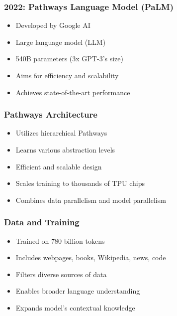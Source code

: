 \begin{frame}[fragile]\frametitle{2022: Pathways Language Model (PaLM)}
    
    \begin{itemize}
        \item Developed by Google AI
        \item Large language model (LLM)
        \item 540B parameters (3x GPT-3's size)
        \item Aims for efficiency and scalability
        \item Achieves state-of-the-art performance
    \end{itemize}
\end{frame}

\begin{frame}[fragile]\frametitle{Pathways Architecture}
    
    \begin{itemize}
        \item Utilizes hierarchical Pathways
        \item Learns various abstraction levels
        \item Efficient and scalable design
        \item Scales training to thousands of TPU chips
        \item Combines data parallelism and model parallelism
    \end{itemize}
\end{frame}

\begin{frame}[fragile]\frametitle{Data and Training}
    
    \begin{itemize}
        \item Trained on 780 billion tokens
        \item Includes webpages, books, Wikipedia, news, code
        \item Filters diverse sources of data
        \item Enables broader language understanding
        \item Expands model's contextual knowledge
    \end{itemize}
\end{frame}

